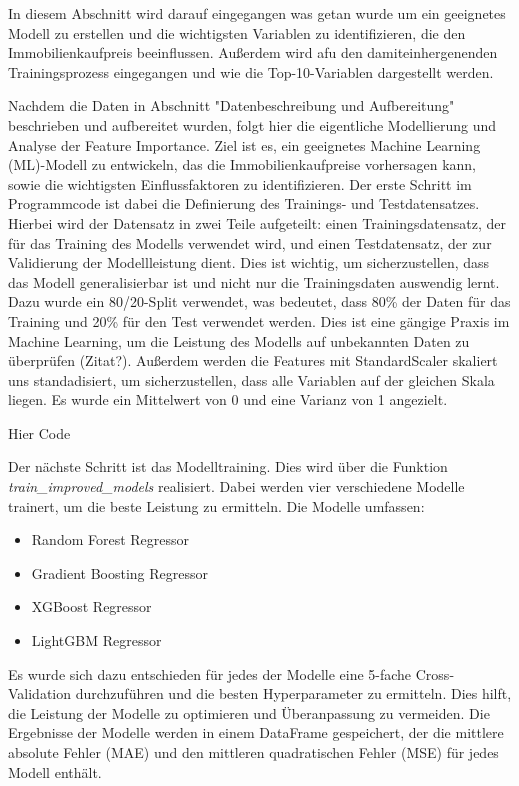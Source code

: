 In diesem Abschnitt wird darauf eingegangen was getan wurde um ein geeignetes Modell zu erstellen und die wichtigsten Variablen zu identifizieren, die den Immobilienkaufpreis beeinflussen. Außerdem wird afu den damiteinhergenenden Trainingsprozess eingegangen und wie die Top-10-Variablen dargestellt werden.

Nachdem die Daten in Abschnitt "Datenbeschreibung und Aufbereitung" beschrieben und aufbereitet wurden, folgt hier die eigentliche Modellierung und Analyse der Feature Importance. Ziel ist es, ein geeignetes Machine Learning (ML)-Modell zu entwickeln, das die Immobilienkaufpreise vorhersagen kann, sowie die wichtigsten Einflussfaktoren zu identifizieren.
Der erste Schritt im Programmcode ist dabei die Definierung des Trainings- und Testdatensatzes. Hierbei wird der Datensatz in zwei Teile aufgeteilt: einen Trainingsdatensatz, der für das Training des Modells verwendet wird, und einen Testdatensatz, der zur Validierung der Modellleistung dient. Dies ist wichtig, um sicherzustellen, dass das Modell generalisierbar ist und nicht nur die Trainingsdaten auswendig lernt.
Dazu wurde ein 80/20-Split verwendet, was bedeutet, dass 80\% der Daten für das Training und 20\% für den Test verwendet werden. Dies ist eine gängige Praxis im Machine Learning, um die Leistung des Modells auf unbekannten Daten zu überprüfen (Zitat?). Außerdem werden die Features mit StandardScaler skaliert uns standadisiert, um sicherzustellen, dass alle Variablen auf der gleichen Skala liegen. Es wurde ein Mittelwert von 0 und eine Varianz von 1 angezielt.

Hier Code

Der nächste Schritt ist das Modelltraining. Dies wird über die Funktion \textit{train\_improved\_models} realisiert. Dabei werden vier verschiedene Modelle trainert, um die beste Leistung zu ermitteln. Die Modelle umfassen:
\begin{itemize}
    \item Random Forest Regressor
    \item Gradient Boosting Regressor
    \item XGBoost Regressor
    \item LightGBM Regressor
\end{itemize}
Es wurde sich dazu entschieden für jedes der Modelle eine 5-fache Cross-Validation durchzuführen und die besten Hyperparameter zu ermitteln. Dies hilft, die Leistung der Modelle zu optimieren und Überanpassung zu vermeiden. Die Ergebnisse der Modelle werden in einem DataFrame gespeichert, der die mittlere absolute Fehler (MAE) und den mittleren quadratischen Fehler (MSE) für jedes Modell enthält.



